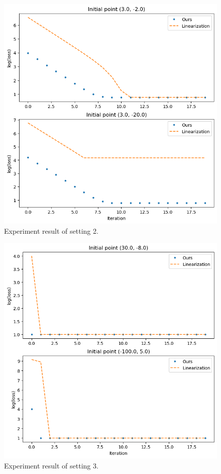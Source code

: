 \documentclass[conference]{IEEEtran}
\begin{document}
\begin{figure}[htbp]
\centerline{\includegraphics [scale=0.5]{./experiment/setting2.png}}
\caption{Experiment result of setting 2.}
\label{fig2}
\end{figure}

\begin{figure}[htbp]
\centerline{\includegraphics [scale=0.5]{./experiment/setting3.png}}
\caption{Experiment result of setting 3.}
\label{fig3}
\end{figure}
\end{document}
